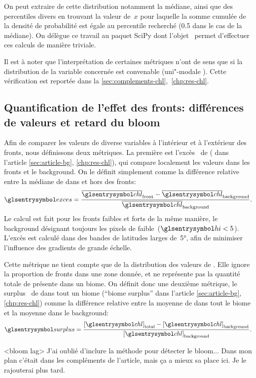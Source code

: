 On peut extraire de cette distribution notamment la médiane, ainsi que des percentiles divers en trouvant la valeur de~\(x\) pour laquelle la somme cumulée de la densité de probabilité est égale au percentile recherché (\num{0.5} dans le cas de la médiane).
On délègue ce travail au paquet SciPy dont l'objet~ permet d'effectuer ces calculs de manière triviale.

Il est à noter que l'interprétation de certaines métriques n'ont de sens que si la distribution de la variable concernée est convenable (uni"-modale ).
Cette vérification est reportée dans la \cref{sec:complements-chl},~\cref*{chp:res-chl}.

\subsection{Quantification de l'effet des fronts: différences de valeurs et retard du bloom}
\label{sec:extraction-surplus-lag}

Afin de comparer les valeurs de diverse variables à l'intérieur et à l'extérieur des fronts, nous définissons deux métriques.
La première est l'excès~ de  ( dans l'article \cref{sec:article-bg}, \cref*{chp:res-chl}), qui compare localement les valeurs dans les fronts et le background. On le définit simplement comme la différence relative entre la médiane de  dans et hors des fronts:
\begin{equation}
  \am{exces} = \frac{\med{\am{chl}}_\frt - \med{\am{chl}}_\bkg}
  {\med{\am{chl}}_\bkg} .
\end{equation}
Le calcul est fait pour les fronts faibles et forts de la même manière, le background désignant toujours les pixels de  faible~(\(\am{hi} < 5\)).
L'excès est calculé dans des bandes de latitudes larges de~\ang{5}, afin de minimiser l'influence des gradients de grande échelle.

Cette métrique ne tient compte que de la distribution des valeurs de . Elle ignore la proportion de fronts dans une zone donnée, et ne représente pas la quantité totale de  présente dans un biome.
On définit donc une deuxième métrique, le surplus~ de  dans tout un biome (\enquote{biome surplus} dans l'article \cref{sec:article-bg}, \cref*{chp:res-chl}) comme la différence relative entre la moyenne de  dans tout le biome et la moyenne dans le background:
\begin{equation}
  \am{surplus} = \frac{\moy{\am{chl}}_\tot - \moy{\am{chl}}_\bkg}
  {\moy{\am{chl}}_\bkg} .
\end{equation}

<bloom lag>
J'ai oublié d'inclure la méthode pour détecter le bloom... Dans mon plan c'était dans les compléments de l'article, mais ça a mieux sa place ici. Je le rajouterai plus tard.
